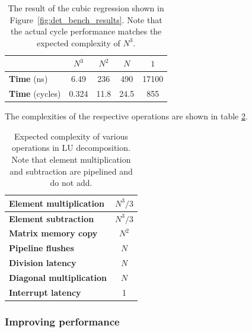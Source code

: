 \documentclass[]{article}
\begin{document}
\begin{table}[htbp]
	\caption{The result of the cubic regression shown in Figure~\ref{fig:det_bench_results}. Note that the actual cycle performance matches the expected complexity of $N^3$.}
	\label{tab:polyfit_coeffs}
	\begin{center}
		\begin{tabular}{l|cccc}
		\hline

		\hline
			& \textbf{$N^3$} & \textbf{$N^2$} & \textbf{$N$} & \textbf{$1$}\\
		\hline
			\textbf{Time} (ns)
			& 6.49 	& 236	& 490	& 17100 \\
			\textbf{Time} (cycles)
			& 0.324 & 11.8 	& 24.5 	& 855 \\
		\hline

		\hline
		\end{tabular}
	\end{center}
\end{table}

The complexities of the respective operations are shown in table \ref{tab:expected_complexity}.

\begin{table}[htbp]
	\caption{Expected complexity of various operations in LU decomposition. Note that element multiplication and subtraction are pipelined and do not add.}
	\label{tab:expected_complexity}
	\begin{center}
		\begin{tabular}{l|c}
		\hline

		\hline
			\textbf{Element multiplication} 	& $N^3/3$ \\
		\hline
			\textbf{Element subtraction} 		& $N^3/3$ \\
		\hline
			\textbf{Matrix memory copy} 		& $N^2$ \\
		\hline
			\textbf{Pipeline flushes} 			& $N$ \\
		\hline
			\textbf{Division latency} 			& $N$ \\
		\hline
			\textbf{Diagonal multiplication} 	& $N$ \\
		\hline
			\textbf{Interrupt latency}			& 1 \\
		\hline
		
		\hline
		\end{tabular}
	\end{center}
\end{table}


\subsubsection{Improving performance} %
\label{sub:improving_performance}
\end{document}
